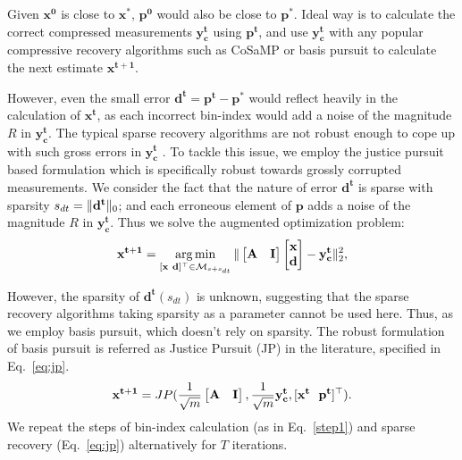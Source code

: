 Given $\mathbf{x^0}$ is close to $\mathbf{x^*}$, $\mathbf{p^0}$ would also be close to $\mathbf{p^*}$. Ideal way is to calculate the correct compressed measurements $\mathbf{y^t_c}$ using $\mathbf{p^t}$, and use $\mathbf{y^t_c}$ with any popular compressive recovery algorithms such as CoSaMP or basis pursuit to calculate the next estimate $\mathbf{{x}^{t+1}}$. 

However, even the small error $\mathbf{d^t} = \mathbf{p^t - p^*}$ would reflect heavily in the calculation of $\mathbf{x^t}$, as each incorrect bin-index would add a noise of the magnitude $R$ in $\mathbf{y^t_c}$. The typical sparse recovery algorithms are not robust enough to cope up with such gross errors in $\mathbf{y^t_c}$ \cite{Laska2009}. To tackle this issue, we employ the justice pursuit based formulation which is specifically robust towards grossly corrupted measurements. We consider the fact that the nature of error $\mathbf{d^t}$ is sparse with sparsity $s_{dt}=\|\mathbf{d^t}\|_0$; and each erroneous element of $\mathbf{p}$ adds a noise of the magnitude $R$ in $\mathbf{y^t_c}$. Thus we solve the augmented optimization problem:
$$
\mathbf{{x}^{t+1}}=\argmin_{[\mathbf{x~d}]^\t \in \mathcal{M}_{s+s_{dt}}}\norm{\begin{bmatrix} \mathbf{A} & \mathbf{I} \end{bmatrix} \begin{bmatrix} \mathbf{x} \\ \mathbf{d} \end{bmatrix} - \mathbf{y^t_c}}_2^2, %
$$

However, the sparsity of $\mathbf{d^t}(s_{dt})$ is unknown, suggesting that the sparse recovery algorithms taking sparsity as a parameter cannot be used here. Thus, as we employ basis pursuit, which doesn't rely on sparsity. The robust formulation of basis pursuit is referred as Justice Pursuit (JP) \cite{Laska2009} in the literature, specified in Eq.~\ref{eq:jp}.
\begin{equation}
\mathbf{{x^{t+1}}} = JP(\frac{1}{\sqrt{m}}\begin{bmatrix} \mathbf{A} & \mathbf{I} \end{bmatrix},\frac{1}{\sqrt{m}}\mathbf{y^t_c},[\mathbf{x^t~~p^t}]^\top).
\label{eq:jp}
\end{equation}
We repeat the steps of bin-index calculation (as in Eq.~\ref{step1}) and sparse recovery (Eq.~\ref{eq:jp}) alternatively for $T$ iterations.%

